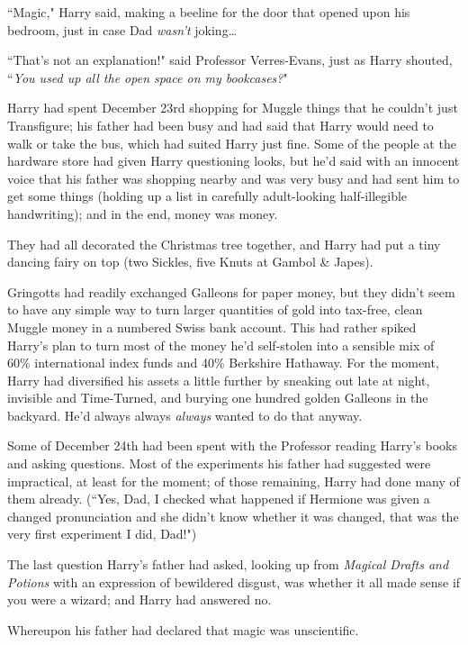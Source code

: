 ``Magic," Harry said, making a beeline for the door that opened upon his bedroom, just in case Dad \emph{wasn't} joking{\ldots}

``That's not an explanation!" said Professor Verres-Evans, just as Harry shouted, ``\emph{You used up all the open space on my bookcases?}"

\later

Harry had spent December 23rd shopping for Muggle things that he couldn't just Transfigure; his father had been busy and had said that Harry would need to walk or take the bus, which had suited Harry just fine. Some of the people at the hardware store had given Harry questioning looks, but he'd said with an innocent voice that his father was shopping nearby and was very busy and had sent him to get some things (holding up a list in carefully adult-looking half-illegible handwriting); and in the end, money was money.

They had all decorated the Christmas tree together, and Harry had put a tiny dancing fairy on top (two Sickles, five Knuts at Gambol \& Japes).

Gringotts had readily exchanged Galleons for paper money, but they didn't seem to have any simple way to turn larger quantities of gold into tax-free, clean Muggle money in a numbered Swiss bank account. This had rather spiked Harry's plan to turn most of the money he'd self-stolen into a sensible mix of 60\% international index funds and 40\% Berkshire Hathaway. For the moment, Harry had diversified his assets a little further by sneaking out late at night, invisible and Time-Turned, and burying one hundred golden Galleons in the backyard. He'd always always \emph{always} wanted to do that anyway.

Some of December 24th had been spent with the Professor reading Harry's books and asking questions. Most of the experiments his father had suggested were impractical, at least for the moment; of those remaining, Harry had done many of them already. (``Yes, Dad, I checked what happened if Hermione was given a changed pronunciation and she didn't know whether it was changed, that was the very first experiment I did, Dad!")

The last question Harry's father had asked, looking up from \emph{Magical Drafts and Potions} with an expression of bewildered disgust, was whether it all made sense if you were a wizard; and Harry had answered no.

Whereupon his father had declared that magic was unscientific.

